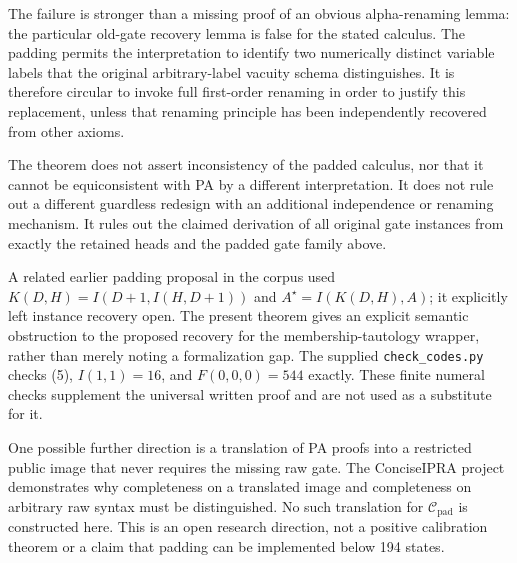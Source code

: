The failure is stronger than a missing proof of an obvious alpha-renaming
lemma: the particular old-gate recovery lemma is false for the stated
calculus. The padding permits the interpretation to identify two
numerically distinct variable labels that the original arbitrary-label
vacuity schema distinguishes. It is therefore circular to invoke full
first-order renaming in order to justify this replacement, unless that
renaming principle has been independently recovered from other axioms.

The theorem does not assert inconsistency of the padded calculus, nor
that it cannot be equiconsistent with PA by a different interpretation.
It does not rule out a different guardless redesign with an additional
independence or renaming mechanism. It rules out the claimed derivation
of all original gate instances from exactly the retained heads and the
padded gate family above.

A related earlier padding proposal in the corpus used
$K(D,H)=I(D+1,I(H,D+1))$ and $A^\star=I(K(D,H),A)$; it explicitly left
instance recovery open. The present theorem gives an explicit semantic
obstruction to the proposed recovery for the membership-tautology
wrapper, rather than merely noting a formalization gap. The supplied
\texttt{check\_codes.py} checks (5), $I(1,1)=16$, and
$F(0,0,0)=544$ exactly. These finite numeral checks supplement the
universal written proof and are not used as a substitute for it.

One possible further direction is a translation of PA proofs into a
restricted public image that never requires the missing raw gate. The
ConciseIPRA project demonstrates why completeness on a translated image
and completeness on arbitrary raw syntax must be distinguished. No such
translation for $\mathcal C_{\mathrm{pad}}$ is constructed here. This is
an open research direction, not a positive calibration theorem or a
claim that padding can be implemented below 194 states.
